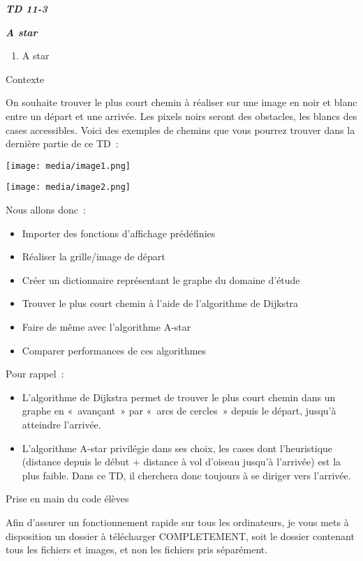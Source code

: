 \documentclass[
]{article}
\author{}
\date{}
\begin{document}
\emph{\textbf{TD 11-3}}

\emph{\textbf{A star}}

\begin{enumerate}
\def\labelenumi{\arabic{enumi}.}
\item
  A star
\end{enumerate}

Contexte

On souhaite trouver le plus court chemin à réaliser sur une image en
noir et blanc entre un départ et une arrivée. Les pixels noirs seront
des obstacles, les blancs des cases accessibles. Voici des exemples de
chemins que vous pourrez trouver dans la dernière partie de ce TD~:

\texttt{[image: media/image1.png]}

\texttt{[image: media/image2.png]}

Nous allons donc~:

\begin{itemize}
\item
  Importer des fonctions d'affichage prédéfinies
\item
  Réaliser la grille/image de départ
\item
  Créer un dictionnaire représentant le graphe du domaine d'étude
\item
  Trouver le plus court chemin à l'aide de l'algorithme de Dijkstra
\item
  Faire de même avec l'algorithme A-star
\item
  Comparer performances de ces algorithmes
\end{itemize}

Pour rappel~:

\begin{itemize}
\item
  L'algorithme de Dijkstra permet de trouver le plus court chemin dans
  un graphe en «~avançant~» par «~arcs de cercles~» depuis le départ,
  jusqu'à atteindre l'arrivée.
\item
  L'algorithme A-star privilégie dans ses choix, les cases dont
  l'heuristique (distance depuis le début + distance à vol d'oiseau
  jusqu'à l'arrivée) est la plus faible. Dans ce TD, il cherchera donc
  toujours à se diriger vers l'arrivée.
\end{itemize}

Prise en main du code élèves

Afin d'assurer un fonctionnement rapide sur tous les ordinateurs, je
vous mets à disposition un dossier à télécharger COMPLETEMENT, soit le
dossier contenant tous les fichiers et images, et non les fichiers pris
séparément.
\end{document}
